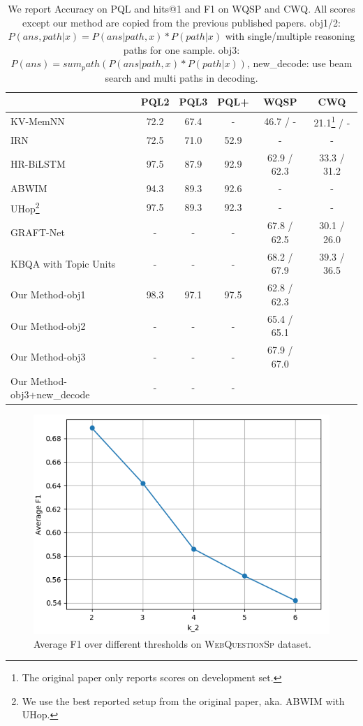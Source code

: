 \begin{table}[h]\centering
\begin{tabular}{|l|c|c|c|c|c|}
\hline
                            & PQL2 & PQL3 & PQL+ & WQSP & CWQ \\
\hline
KV-MemNN \cite{DBLP:conf/emnlp/MillerFDKBW16}    & 72.2 & 67.4 & -    & 46.7 / - & 21.1\footnote{The original paper only reports scores on development set.} / -      \\
IRN \cite{DBLP:conf/coling/ZhouHZ18}                         & 72.5 & 71.0   & 52.9 & -    & -         \\
HR-BiLSTM \cite{DBLP:conf/acl/YuYHSXZ17}                  & 97.5 & 87.9 & 92.9 & 62.9 / 62.3 & 33.3 / 31.2         \\
ABWIM \cite{DBLP:journals/corr/abs-1801-09893}                      & 94.3 & 89.3 & 92.6 & -    & -         \\
UHop\footnote{We use the best reported setup from the original paper, aka. ABWIM with UHop.} \cite{DBLP:conf/naacl/ChenCCNK19}                       & 97.5 & 89.3 & 92.3 & -    & -         \\
GRAFT-Net \cite{DBLP:conf/emnlp/SunDZMSC18}                  & -    & -    & -    & 67.8 / 62.5 & 30.1 / 26.0      \\
KBQA with Topic Units \cite{DBLP:conf/ijcai/LanW019}                  & -    & -    & -    & 68.2 / 67.9 & 39.3 / 36.5      \\
\hline
Our Method-obj1             & 98.3 & 97.1 & 97.5 &    62.8 / 62.3  &           \\
Our Method-obj2             &   -   &   -   &   -   &  65.4 / 65.1     &           \\
Our Method-obj3             &     - &  -    &   -   &   67.9 / 67.0    &           \\
Our Method-obj3+new\_decode & -     &   -   &    -   &     &          \\
\hline
\end{tabular}
\caption{\fontsize{10}{12}\selectfont We report Accuracy on PQL and hits@1 and F1 on WQSP and CWQ. All scores except our method are copied from the previous published papers. obj1/2: $P(ans, path|x)= P(ans|path,x)*P(path|x)$ with single/multiple reasoning paths for one sample. obj3: $P(ans) = sum_path(P(ans|path,x)*P(path|x))$, new\_decode: use beam search and multi paths in decoding.}\label{tab:main}
\end{table}


\begin{figure}[h]
\centering
\includegraphics[width=0.85\columnwidth]{figs/fig2.png}
\vspace{-2ex}
\caption{\fontsize{10}{12}\selectfont Average F1 over different thresholds on \textsc{WebQuestionSp} dataset.}
\label{fig:k2}
\end{figure}